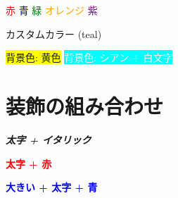 \documentclass[lualatex,ja=standard]{bxjsarticle}
\begin{document}
\textcolor{red}{赤}
\textcolor{blue}{青}
\textcolor{green}{緑}
\textcolor{orange}{オレンジ}
\textcolor{purple}{紫}

\textcolor[RGB]{0,128,128}{カスタムカラー (teal)}

\colorbox{yellow}{背景色: 黄色}
\colorbox{cyan}{\textcolor{white}{背景色: シアン + 白文字}}

\section{装飾の組み合わせ}

\textbf{\textit{太字 + イタリック}}

\textbf{\textcolor{red}{太字 + 赤}}

{\Large \textbf{\textcolor{blue}{大きい + 太字 + 青}}}
\end{document}
